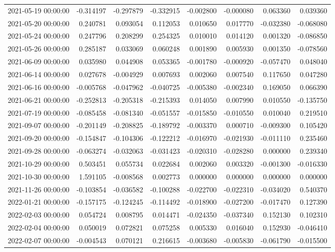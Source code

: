 \begin{tabular}{lrrrrrrr}
2021-05-19 00:00:00 & -0.314197 & -0.297879 & -0.332915 & -0.002800 & -0.000080 & 0.063360 & 0.039360 \\
2021-05-20 00:00:00 & 0.240781 & 0.093054 & 0.112053 & 0.010650 & 0.017770 & -0.032380 & -0.068080 \\
2021-05-24 00:00:00 & 0.247796 & 0.208299 & 0.254325 & 0.010010 & 0.014120 & 0.001320 & -0.086850 \\
2021-05-26 00:00:00 & 0.285187 & 0.033069 & 0.060248 & 0.001890 & 0.005930 & 0.001350 & -0.078560 \\
2021-06-09 00:00:00 & 0.035980 & 0.044908 & 0.053365 & -0.001780 & -0.000920 & -0.057470 & 0.048040 \\
2021-06-14 00:00:00 & 0.027678 & -0.004929 & 0.007693 & 0.002060 & 0.007540 & 0.117650 & 0.047280 \\
2021-06-16 00:00:00 & -0.005768 & -0.047962 & -0.040725 & -0.005380 & -0.002340 & 0.169050 & 0.066390 \\
2021-06-21 00:00:00 & -0.252813 & -0.205318 & -0.215393 & 0.014050 & 0.007990 & 0.010550 & -0.135750 \\
2021-07-19 00:00:00 & -0.085458 & -0.081340 & -0.051557 & -0.015850 & -0.010550 & 0.010040 & 0.219510 \\
2021-09-07 00:00:00 & -0.201149 & -0.208825 & -0.189792 & -0.003370 & 0.000710 & -0.009300 & 0.105420 \\
2021-09-20 00:00:00 & -0.154847 & -0.104306 & -0.122212 & -0.016970 & -0.021930 & -0.011110 & 0.235460 \\
2021-09-28 00:00:00 & -0.063274 & -0.032063 & -0.031423 & -0.020310 & -0.028280 & 0.000000 & 0.239340 \\
2021-10-29 00:00:00 & 0.503451 & 0.055734 & 0.022684 & 0.002060 & 0.003320 & -0.001300 & -0.016330 \\
2021-10-30 00:00:00 & 1.591105 & -0.008568 & 0.002773 & 0.000000 & 0.000000 & 0.000000 & 0.000000 \\
2021-11-26 00:00:00 & -0.103854 & -0.036582 & -0.100288 & -0.022700 & -0.022310 & -0.034020 & 0.540370 \\
2022-01-21 00:00:00 & -0.157175 & -0.124245 & -0.114492 & -0.018900 & -0.027200 & -0.017470 & 0.127390 \\
2022-02-03 00:00:00 & 0.054724 & 0.008795 & 0.014471 & -0.024350 & -0.037340 & 0.152130 & 0.102310 \\
2022-02-04 00:00:00 & 0.050019 & 0.072821 & 0.075258 & 0.005330 & 0.016040 & 0.152930 & -0.046410 \\
2022-02-07 00:00:00 & -0.004543 & 0.070121 & 0.216615 & -0.003680 & -0.005830 & -0.061790 & -0.015500 \\

\end{tabular}
